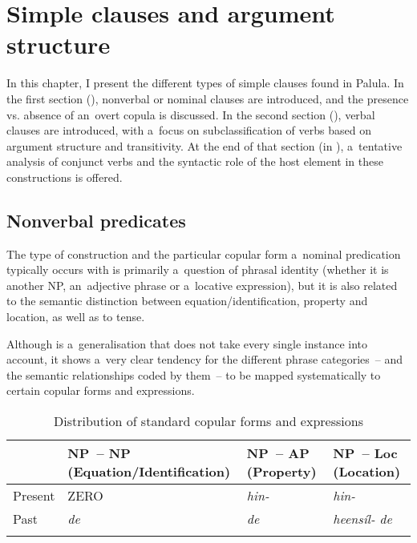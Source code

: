 \chapter{Simple clauses and argument structure}
\label{chap:12}

In this chapter, I present the different types of simple clauses found in Palula. In the first section (), nonverbal or nominal clauses are introduced, and the presence vs. absence of an~overt copula is discussed. In the second section (), verbal clauses are introduced, with a~focus on subclassification of verbs based on argument structure and transitivity. At the end of that section (in ), a~tentative analysis of conjunct verbs and the syntactic role of the host element in these constructions is offered. 


\section{Nonverbal predicates}
\label{sec:12-1}

The type of construction and the particular copular form a~nominal predication typically occurs with is primarily a~question of phrasal identity (whether it is another NP, an~adjective phrase or a~locative expression), but it is also related to the semantic distinction between equation/identification, property and location, as well as to tense.


Although  is a~generalisation that does not take every single instance into account, it shows a~very clear tendency for the different phrase categories~-- and the semantic relationships coded by them~-- to be mapped systematically to certain copular forms and expressions. 


\begin{table}[ht]
\caption{Distribution of standard copular forms and expressions}
\begin{tabularx}{\textwidth}{ l Q Q Q }
\lsptoprule
&
NP~-- NP
(Equation/{\allowbreak}Identification) &
NP~-- AP
(Property) &
NP~-- Loc
(Location)\\\hline
Present &
ZERO &
\textit{hin-} &
\textit{hin-}\\
Past &
\textit{de} &
\textit{de} &
\textit{heensíl- de}\\\lspbottomrule
\end{tabularx}
\label{tab:12-1}
\end{table}



